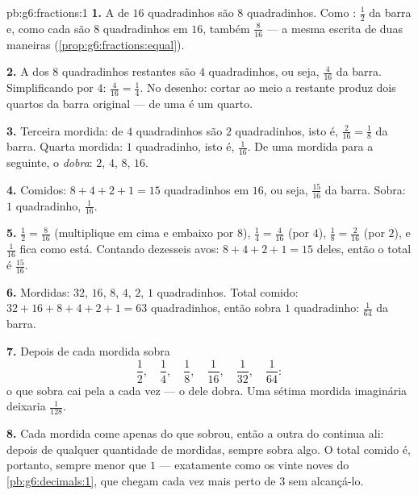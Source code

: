 \begin{solution}{pb:g6:fractions:1}
\textbf{1.} A  de $16$ quadradinhos são $8$ quadradinhos. Como
: $\frac12$ da barra e, como cada  são $8$ quadradinhos em
$16$, também $\frac{8}{16}$ --- a mesma  escrita de duas maneiras
(\cref{prop:g6:fractions:equal}).

\textbf{2.} A  dos $8$ quadradinhos restantes são $4$
quadradinhos, ou seja, $\frac{4}{16}$ da barra. Simplificando por $4$:
$\frac{4}{16} = \frac14$. No desenho: cortar ao meio a  restante
produz dois quartos da barra original ---  de uma  é um
quarto.

\textbf{3.} Terceira mordida:  de $4$ quadradinhos são $2$
quadradinhos, isto é, $\frac{2}{16} = \frac18$ da barra. Quarta
mordida: $1$ quadradinho, isto é, $\frac{1}{16}$. De uma mordida para
a seguinte, o  \emph{dobra}: $2$, $4$, $8$, $16$.

\textbf{4.} Comidos: $8 + 4 + 2 + 1 = 15$ quadradinhos em $16$, ou
seja, $\frac{15}{16}$ da barra. Sobra: $1$ quadradinho,
$\frac{1}{16}$.

\textbf{5.} $\frac12 = \frac{8}{16}$ (multiplique em cima e embaixo por
$8$), $\frac14 = \frac{4}{16}$ (por $4$), $\frac18 = \frac{2}{16}$ (por
$2$), e $\frac{1}{16}$ fica como está. Contando dezesseis avos:
$8 + 4 + 2 + 1 = 15$ deles, então o total é $\frac{15}{16}$.

\textbf{6.} Mordidas: $32$, $16$, $8$, $4$, $2$, $1$ quadradinhos.
Total comido: $32 + 16 + 8 + 4 + 2 + 1 = 63$ quadradinhos, então sobra
$1$ quadradinho: $\frac{1}{64}$ da barra.

\textbf{7.} Depois de cada mordida sobra
\[
\frac12,\quad \frac14,\quad \frac18,\quad \frac{1}{16},\quad
\frac{1}{32},\quad \frac{1}{64} :
\]
o que sobra cai pela  a cada vez --- o  dele dobra.
Uma sétima mordida imaginária deixaria $\frac{1}{128}$.

\textbf{8.} Cada mordida come apenas \emph{} do que sobrou, então
a outra  do  continua ali: depois de qualquer quantidade de
mordidas, sempre sobra algo. O total comido é, portanto, sempre menor
que $1$ --- exatamente como os vinte noves do
\cref{pb:g6:decimals:1}, que chegam cada vez mais perto de $3$ sem
alcançá-lo.


\end{solution}
